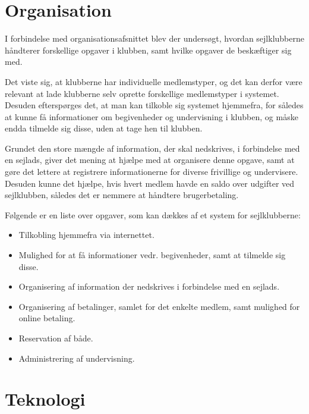\section{Organisation}

I forbindelse med organisationsafsnittet blev der undersøgt, hvordan sejlklubberne håndterer forskellige opgaver i klubben, samt hvilke opgaver de beskæftiger sig med.

Det viste sig, at klubberne har individuelle medlemstyper, og det kan derfor være relevant at lade klubberne selv oprette forskellige medlemstyper i systemet. 
Desuden efterspørges det, at man kan tilkoble sig systemet hjemmefra, for således at kunne få informationer om begivenheder og undervisning i klubben, og måske endda tilmelde sig disse, uden at tage hen til klubben.

Grundet den store mængde af information, der skal nedskrives, i forbindelse med en sejlads, giver det mening at hjælpe med at organisere denne opgave, samt at gøre det lettere at registrere informationerne for diverse frivillige og undervisere. 
Desuden kunne det hjælpe, hvis hvert medlem havde en saldo over udgifter ved sejlklubben, således det er nemmere at håndtere brugerbetaling.

Følgende er en liste over opgaver, som kan dækkes af et system for sejlklubberne:

\begin{itemize}
  \item Tilkobling hjemmefra via internettet.
  \item Mulighed for at få informationer vedr. begivenheder, samt at tilmelde sig disse.
  \item Organisering af information der nedskrives i forbindelse med en sejlads.
  \item Organisering af betalinger, samlet for det enkelte medlem, samt mulighed for online betaling.
  \item Reservation af både. 
  \item Administrering af undervisning.
\end{itemize}


\section{Teknologi}

